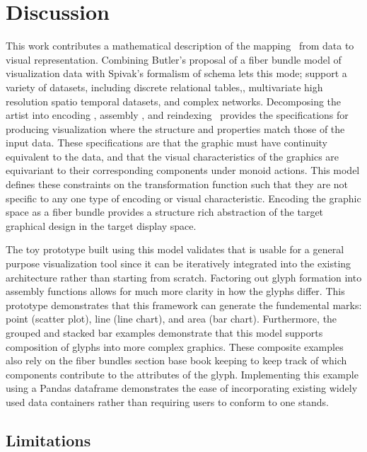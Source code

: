 \documentclass[../main.tex]{subfiles}
\begin{document}
\section{Discussion}



This work contributes a mathematical description of the mapping \vartist\ from data to visual representation. Combining Butler's proposal of a fiber bundle model of visualization data with Spivak's formalism of schema lets this mode; support a variety of datasets, including  discrete relational tables,, multivariate high resolution spatio temporal datasets, and complex networks. Decomposing the artist into encoding \vchannel, assembly \vmark, and reindexing \vindex\ provides the specifications for producing visualization where the structure and properties match those of the input data. These specifications are that the graphic must have continuity equivalent to the data, and that the visual characteristics of the graphics are equivariant to their corresponding components under monoid actions. This model defines these constraints on the transformation function such that they are not specific to any one type of encoding or visual characteristic. Encoding the graphic space as a fiber bundle provides a structure rich abstraction of the target graphical design in the target display space. 


The toy prototype built using this model validates that is usable for a general purpose visualization tool since it can be iteratively integrated into the existing architecture rather than starting from scratch. Factoring out glyph formation into assembly functions allows for much more clarity in how the glyphs differ. This prototype demonstrates that this framework can generate the fundemental marks: point (scatter plot), line (line chart), and area (bar chart). Furthermore, the grouped and stacked bar examples demonstrate that this model supports composition of glyphs into more complex graphics. These composite examples also rely on the fiber bundles section base book keeping to keep track of which components contribute to the attributes of the glyph. Implementing this example using a Pandas dataframe demonstrates the ease of incorporating existing widely used data containers rather than requiring users to conform to one stands.  

\subsection{Limitations}
\end{document}
